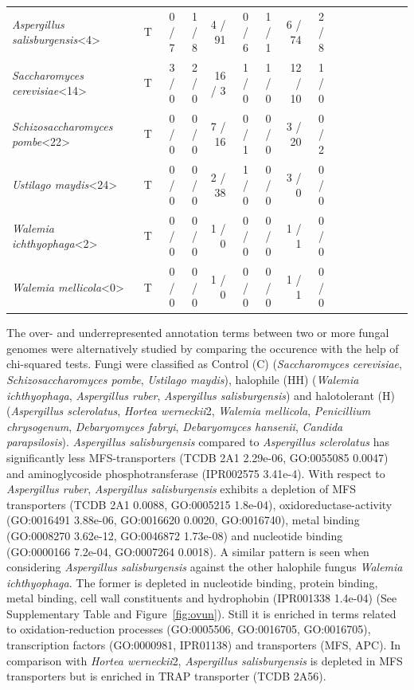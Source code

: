 \documentclass[jof,article,submit,moreauthors,pdftex,10pt,a4paper]{Definitions/mdpi}
\newcommand{\horWer}{\textit{Hortea werneckii}}
\newcommand{\aspRub}{\textit{Aspergillus ruber}}
\newcommand{\penChr}{\textit{Penicillium chrysogenum}}
\newcommand{\debFab}{\textit{Debaryomyces fabryi}}
\newcommand{\debHan}{\textit{Debaryomyces hansenii}}
\newcommand{\walIch}{\textit{Walemia ichthyophaga}}
\newcommand{\walMel}{\textit{Walemia mellicola}}
\newcommand{\canPar}{\textit{Candida parapsilosis}}
\newcommand{\sacCer}{\textit{Saccharomyces cerevisiae}}
\newcommand{\schPom}{\textit{Schizosaccharomyces pombe}}
\newcommand{\phiSp}{\textit{Aspergillus salisburgensis}}
\newcommand{\phiScl}{\textit{Aspergillus sclerolatus}}
\newcommand{\ustMay}{\textit{Ustilago maydis}}
\begin{document}
\begin{table}[htbp]
\begin{tabular}{llrrrrrrrrrrrrrr}
\phiSp<4> & T & 0 / 7 & 1 / 8 & 4 / 91 & 0 / 6 & 1 / 1 & 6 / 74 & 2 / 8\\
\sacCer<14> & T & 3 / 0 & 2 / 0 & 16 / 3 & 1 / 0 & 1 / 0 & 12 / 10 & 1 / 0\\
\schPom<22> & T & 0 / 0 & 0 / 0 & 7 / 16 & 0 / 1 & 0 / 0 & 3 / 20 & 0 / 2\\
\ustMay<24> & T & 0 / 0 & 0 / 0 & 2 / 38 & 1 / 0 & 0 / 0 & 3 / 0 & 0 / 0\\
\walIch<2> & T & 0 / 0 & 0 / 0 & 1 / 0 & 0 / 0 & 0 / 0 & 1 / 1 & 0 / 0\\
\walMel<0> & T & 0 / 0 & 0 / 0 & 1 / 0 & 0 / 0 & 0 / 0 & 1 / 1 & 0 / 0\\
\hline
\end{tabular}
\end{table}

The over- and underrepresented annotation terms between two or more fungal genomes were alternatively studied by comparing the occurence with the help of chi-squared tests. Fungi were classified as Control (C) (\sacCer{}, \schPom{}, \ustMay{}), halophile (HH) (\walIch{}, \aspRub{}, \phiSp{}) and halotolerant (H) (\phiScl{}, \horWer2{}, \walMel{}, \penChr{}, \debFab{}, \debHan{}, \canPar{}). 
\phiSp{} compared to \phiScl{} has significantly less MFS-transporters (TCDB 2A1 2.29e-06, GO:0055085 0.0047) and aminoglycoside phosphotransferase (IPR002575 3.41e-4). With respect to \aspRub{}, \phiSp{} exhibits a depletion of MFS transporters (TCDB 2A1 0.0088, GO:0005215 1.8e-04), oxidoreductase-activity (GO:0016491 3.88e-06, GO:0016620 0.0020, GO:0016740), metal binding (GO:0008270 3.62e-12, GO:0046872 1.73e-08) and nucleotide binding (GO:0000166 7.2e-04, GO:0007264 0.0018). A similar pattern is seen when considering \phiSp{} against the other halophile fungus \walIch{}. The former is depleted in nucleotide binding, protein binding, metal binding, cell wall constituents and hydrophobin (IPR001338 1.4e-04) (See Supplementary Table and Figure~\ref{fig:ovun}). Still it is enriched in terms related to oxidation-reduction processes (GO:0005506, GO:0016705, GO:0016705), transcription factors (GO:0000981, IPR01138) and transporters (MFS, APC).
In comparison with \horWer2{}, \phiSp{} is depleted in MFS transporters but is enriched in TRAP transporter (TCDB 2A56).
\end{document}
